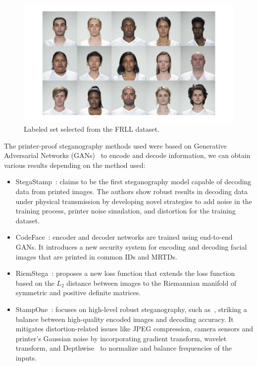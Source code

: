 \begin{figure}
    \centering
    \includegraphics[width=1\linewidth]{images/subdataset.png}
    \caption{Labeled set selected from the FRLL dataset.}\label{fig:subdataset}
\end{figure}

The printer-proof steganography methods used were based on Generative Adversarial Networks (GANs)~\cite{gans2018} to encode and decode information, we can obtain various results depending on the method used:

\begin{itemize}
    \item StegaStamp~\cite{stegastamp2020}: claims to be the first steganography model capable of decoding data from printed images. The authors show robust results in decoding data under physical transmission by developing novel strategies to add noise in the training process, printer noise simulation, and distortion for the training dataset.
    \item CodeFace~\cite{codeface2021}: encoder and decoder networks are trained using end-to-end GANs. It introduces a new security system for encoding and decoding facial images that are printed in common IDs and MRTDs.
    \item RiemStega~\cite{cruz2025riemstega}: proposes a new loss function that extends the loss function based on the $L_2$ distance between images to the Riemannian manifold of symmetric and positive definite matrices.
    \item StampOne~\cite{stampone2023}: focuses on high-level robust steganography, such as~\cite{codeface2021, stegastamp2020}, striking a balance between high-quality encoded images and decoding accuracy. It mitigates distortion-related issues like JPEG compression, camera sensors and printer's Gaussian noise by incorporating gradient transform, wavelet transform, and Depthwise~\cite{tay2022efficient} to normalize and balance frequencies of the inputs. 
\end{itemize}


